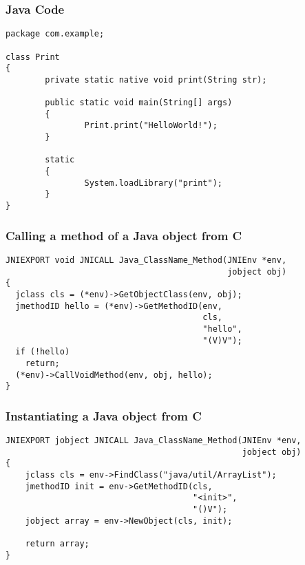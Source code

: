\begin{frame}[fragile]
  \frametitle{Java Code}
\begin{verbatim}
package com.example;

class Print
{
        private static native void print(String str);

        public static void main(String[] args)
        {
                Print.print("HelloWorld!");
        }

        static
        {
                System.loadLibrary("print");
        }
}
\end{verbatim}
\end{frame}

\begin{frame}[fragile]
  \frametitle{Calling a method of a Java object from C}
\begin{verbatim}
JNIEXPORT void JNICALL Java_ClassName_Method(JNIEnv *env,
                                             jobject obj)
{
  jclass cls = (*env)->GetObjectClass(env, obj);
  jmethodID hello = (*env)->GetMethodID(env,
                                        cls,
                                        "hello",
                                        "(V)V");
  if (!hello)
    return;
  (*env)->CallVoidMethod(env, obj, hello);
}
\end{verbatim}
\end{frame}

\begin{frame}[fragile]
  \frametitle{Instantiating a Java object from C}
\begin{verbatim}
JNIEXPORT jobject JNICALL Java_ClassName_Method(JNIEnv *env,
                                                jobject obj) 
{
    jclass cls = env->FindClass("java/util/ArrayList");
    jmethodID init = env->GetMethodID(cls,
                                      "<init>",
                                      "()V");
    jobject array = env->NewObject(cls, init);

    return array;
}
\end{verbatim}
\end{frame}
